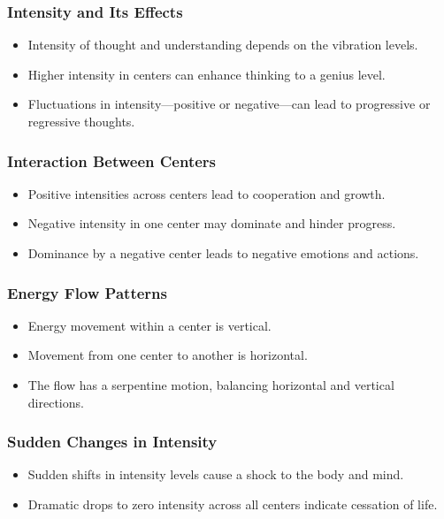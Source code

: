 \begin{frame}[fragile]\frametitle{Intensity and Its Effects}
    \begin{itemize}
        \item Intensity of thought and understanding depends on the vibration levels.
        \item Higher intensity in centers can enhance thinking to a genius level.
        \item Fluctuations in intensity—positive or negative—can lead to progressive or regressive thoughts.
    \end{itemize}
\end{frame}

\begin{frame}[fragile]\frametitle{Interaction Between Centers}
    \begin{itemize}
        \item Positive intensities across centers lead to cooperation and growth.
        \item Negative intensity in one center may dominate and hinder progress.
        \item Dominance by a negative center leads to negative emotions and actions.
    \end{itemize}
\end{frame}

\begin{frame}[fragile]\frametitle{Energy Flow Patterns}
    \begin{itemize}
        \item Energy movement within a center is vertical.
        \item Movement from one center to another is horizontal.
        \item The flow has a serpentine motion, balancing horizontal and vertical directions.
    \end{itemize}
\end{frame}

\begin{frame}[fragile]\frametitle{Sudden Changes in Intensity}
    \begin{itemize}
        \item Sudden shifts in intensity levels cause a shock to the body and mind.
        \item Dramatic drops to zero intensity across all centers indicate cessation of life.
    \end{itemize}
\end{frame}


